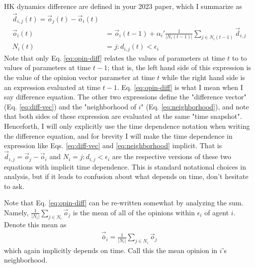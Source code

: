 \documentclass{article}
\begin{document}
HK dynamics difference are defined in your 2023 paper, which I summarize as
\begin{subequations}
    \begin{align}
        {\vec{d}}_{i,j}(t) = {\vec{o}}_j(t) - {\vec{o}}_i(t) \label{eq:diff-vec}\\
        {\vec{o}}_i(t) &= {\vec{o}}_i(t-1) + \alpha_i' \frac{1}{|N_i(t-1)|} \sum_{j\in N_i(t-1)}  {\vec{d}}_{i,j}\label{eq:opin-diff}\\
        N_i(t) &= {j: d_{i,j}(t) < \epsilon_i} \label{eq:neighborhood}
    \end{align}
\end{subequations}    
Note that only Eq. \ref{eq:opin-diff} relates the values of parameters at time $t$ to 
to values of parameters at time $t - 1$; that is, the left hand side of this expression is the value of the
opinion vector parameter at time $t$ while the right hand side is an expression evaluated at time $t-1$.
Eq. \ref{eq:opin-diff} is what I mean when I say difference equation.  The other two expressions define the
"difference vector" (Eq. \ref{eq:diff-vec}) and the "neighborhood of $i$" (Eq. \ref{eq:neighborhood}), and note that
both sides of these expression are evaluated at the same "time snapshot".  
Henceforth, I will only explicitly
use the time dependence notation when writing the difference equation, and for brevity
I will make the time dependence in expression like Eqs. \ref{eq:diff-vec} and \ref{eq:neighborhood}
implicit.  That is ${\vec{d}}_{i,j} = {\vec{o}}_j - {\vec{o}}_i$ and $N_i = {j: d_{i,j} < \epsilon_i}$
are the respective versions of these two equations with implicit time dependence.
This is standard notational choices in analysis, but if it leads to confusion about 
what depends on time, don't hesitate to ask.

Note that Eq. \ref{eq:opin-diff} can be re-written somewhat by analyzing the sum.
Namely, $ \frac{1}{|N_i|} \sum_{j\in N_i} {\vec{o}}_j$ is the mean of all of the opinions
within $\epsilon_i$ of agent $i$.  Denote this mean as
\begin{align}
    {\vec{{\bar{o}}}}_i = \frac{1}{|N_i|} \sum_{j\in N_i} {\vec{o}}_j\label{eq:neighborhood-mean}
\end{align}
which again implicitly depends on time.  Call this the mean opinion in $i$'s neighborhood.
\end{document}
